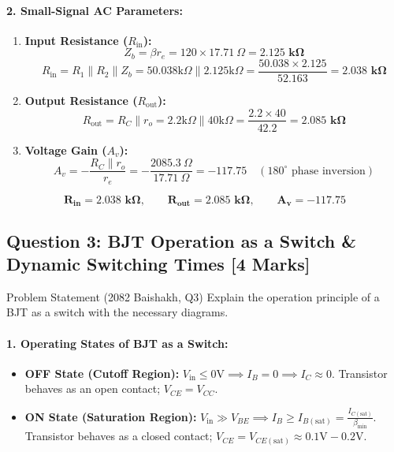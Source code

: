 \documentclass[11pt,a4paper,oneside]{book}
\begin{document}
\paragraph{2. Small-Signal AC Parameters:}
\begin{enumerate}[leftmargin=1.5em]
  \item \textbf{Input Resistance ($R_{\text{in}}$):}
  \[
  Z_b = \beta r_e = 120 \times 17.71\ \Omega = \mathbf{2.125\text{ k}\Omega}
  \]
  \[
  R_{\text{in}} = R_1 \parallel R_2 \parallel Z_b = 50.038\text{k}\Omega \parallel 2.125\text{k}\Omega = \frac{50.038 \times 2.125}{52.163} = \mathbf{2.038\text{ k}\Omega}
  \]
  \item \textbf{Output Resistance ($R_{\text{out}}$):}
  \[
  R_{\text{out}} = R_C \parallel r_o = 2.2\text{k}\Omega \parallel 40\text{k}\Omega = \frac{2.2 \times 40}{42.2} = \mathbf{2.085\text{ k}\Omega}
  \]
  \item \textbf{Voltage Gain ($A_v$):}
  \[
  A_v = -\frac{R_C \parallel r_o}{r_e} = -\frac{2085.3\ \Omega}{17.71\ \Omega} = \mathbf{-117.75} \quad (180^\circ \text{ phase inversion})
  \]
\end{enumerate}

\begin{answerbox}
$$\mathbf{R_{\text{in}} = 2.038\text{ k}\Omega, \qquad R_{\text{out}} = 2.085\text{ k}\Omega, \qquad A_v = -117.75}$$
\end{answerbox}

\vspace{0.6cm}

\subsection{Question 3: BJT Operation as a Switch \& Dynamic Switching Times [4 Marks]}
\begin{questionbox}{Problem Statement (2082 Baishakh, Q3)}
Explain the operation principle of a BJT as a switch with the necessary diagrams.
\end{questionbox}

\paragraph{1. Operating States of BJT as a Switch:}
\begin{itemize}[leftmargin=1.5em]
  \item \textbf{OFF State (Cutoff Region):} $V_{\text{in}} \le 0\text{V} \implies I_B = 0 \implies I_C \approx 0$. Transistor behaves as an open contact; $V_{CE} = V_{CC}$.
  \item \textbf{ON State (Saturation Region):} $V_{\text{in}} \gg V_{BE} \implies I_B \ge I_{B(\text{sat})} = \frac{I_{C(\text{sat})}}{\beta_{\min}}$. Transistor behaves as a closed contact; $V_{CE} = V_{CE(\text{sat})} \approx 0.1\text{V} - 0.2\text{V}$.
\end{itemize}
\end{document}
